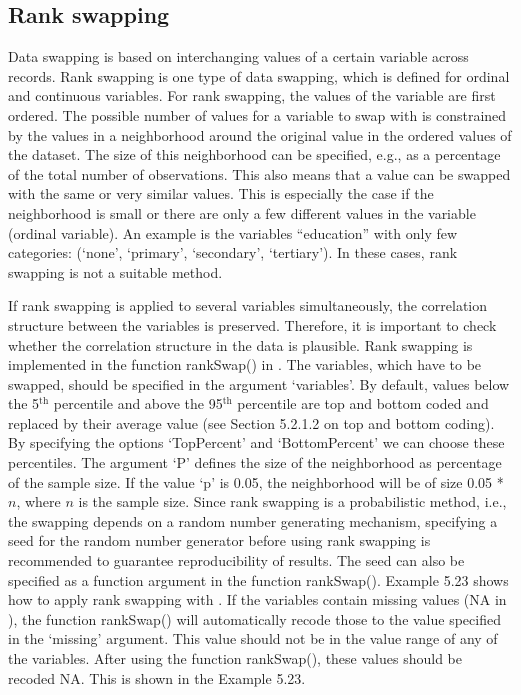 \documentclass[letterpaper,10pt,english]{sphinxmanual}
\begin{document}
\subsection{Rank swapping}
\label{\detokenize{anon_methods:rank-swapping}}
Data swapping is based on interchanging values of a certain variable
across records. Rank swapping is one type of data swapping, which is
defined for ordinal and continuous variables. For rank swapping, the
values of the variable are first ordered. The possible number of values
for a variable to swap with is constrained by the values in a
neighborhood around the original value in the ordered values of the
dataset. The size of this neighborhood can be specified, e.g., as a
percentage of the total number of observations. This also means that a
value can be swapped with the same or very similar values. This is
especially the case if the neighborhood is small or there are only a few
different values in the variable (ordinal variable). An example is the
variables “education” with only few categories: (‘none’, ‘primary’,
‘secondary’, ‘tertiary’). In these cases, rank swapping is not a
suitable method.

If rank swapping is applied to several variables simultaneously, the
correlation structure between the variables is preserved. Therefore, it
is important to check whether the correlation structure in the data is
plausible. Rank swapping is implemented in the function rankSwap() in
. The variables, which have to be swapped, should be specified
in the argument ‘variables’. By default, values below the 5$^{\text{th}}$
percentile and above the 95$^{\text{th}}$ percentile are top and bottom
coded and replaced by their average value (see Section 5.2.1.2 on top
and bottom coding). By specifying the options ‘TopPercent’ and
‘BottomPercent’ we can choose these percentiles. The argument ‘P’
defines the size of the neighborhood as percentage of the sample size.
If the value ‘p’ is 0.05, the neighborhood will be of size 0.05 *
\(n\), where \(n\) is the sample size. Since rank swapping is a
probabilistic method, i.e., the swapping depends on a random number
generating mechanism, specifying a seed for the random number generator
before using rank swapping is recommended to guarantee reproducibility
of results. The seed can also be specified as a function argument in the
function rankSwap(). Example 5.23 shows how to apply rank swapping with
. If the variables contain missing values (NA in ), the
function rankSwap() will automatically recode those to the value
specified in the ‘missing’ argument. This value should not be in the
value range of any of the variables. After using the function
rankSwap(), these values should be recoded NA. This is shown in the
Example 5.23.
\end{document}
